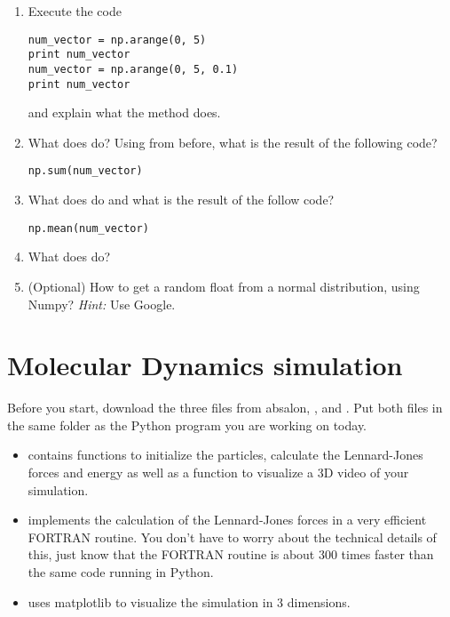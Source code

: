 \documentclass{article}
\begin{document}
\begin{enumerate}[resume]
   \item Execute the code

\begin{lstlisting}
num_vector = np.arange(0, 5)
print num_vector
num_vector = np.arange(0, 5, 0.1)
print num_vector
\end{lstlisting}

   and explain what the method  does.

   \item What does  do? Using  from before, what is the result of the following code?

\begin{lstlisting}
np.sum(num_vector)
\end{lstlisting}


   \item What does  do and what is the result of the follow code?

\begin{lstlisting}
np.mean(num_vector)
\end{lstlisting}

   \item What does  do?

   \item (Optional) How to get a random float from a normal distribution, using Numpy? \newline
       {\em Hint:} Use Google.

\end{enumerate}


\newpage

\section{Molecular Dynamics simulation}

Before you start, download the three files from absalon, ,  and .
Put both files in the same folder as the Python program you are working on today.

\begin{itemize}

    \item {} contains functions to initialize the particles, calculate the Lennard-Jones forces and energy as well as a function to visualize a 3D video of your simulation.
    \item {} implements the calculation of the Lennard-Jones forces in a very efficient FORTRAN routine.
        You don't have to worry about the technical details of this, just know that the FORTRAN routine is about 300 times faster than the same code running in Python.

    \item {} uses matplotlib to visualize the simulation in 3 dimensions.

\end{itemize}
\end{document}
